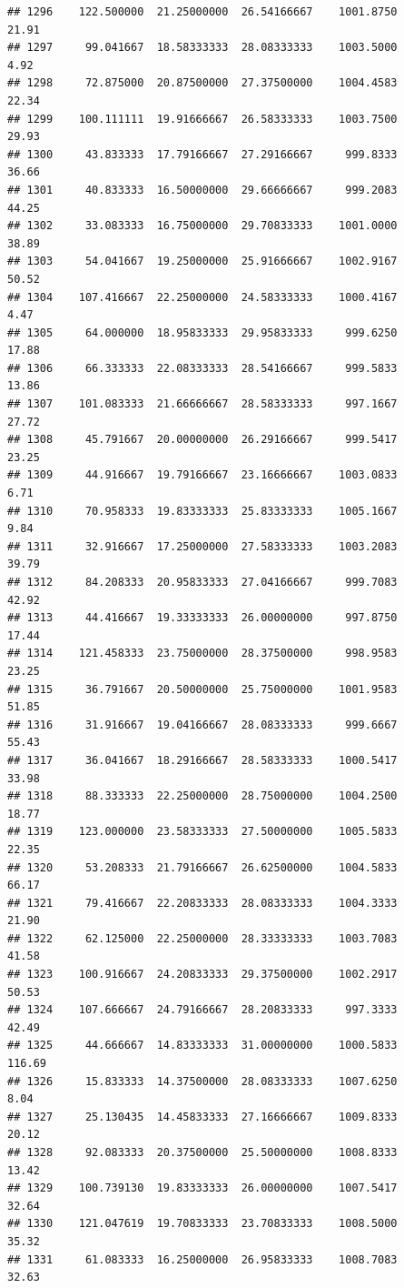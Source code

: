 \documentclass[
]{article}
\begin{document}
\begin{verbatim}
## 1296    122.500000  21.25000000  26.54166667    1001.8750       21.91
## 1297     99.041667  18.58333333  28.08333333    1003.5000        4.92
## 1298     72.875000  20.87500000  27.37500000    1004.4583       22.34
## 1299    100.111111  19.91666667  26.58333333    1003.7500       29.93
## 1300     43.833333  17.79166667  27.29166667     999.8333       36.66
## 1301     40.833333  16.50000000  29.66666667     999.2083       44.25
## 1302     33.083333  16.75000000  29.70833333    1001.0000       38.89
## 1303     54.041667  19.25000000  25.91666667    1002.9167       50.52
## 1304    107.416667  22.25000000  24.58333333    1000.4167        4.47
## 1305     64.000000  18.95833333  29.95833333     999.6250       17.88
## 1306     66.333333  22.08333333  28.54166667     999.5833       13.86
## 1307    101.083333  21.66666667  28.58333333     997.1667       27.72
## 1308     45.791667  20.00000000  26.29166667     999.5417       23.25
## 1309     44.916667  19.79166667  23.16666667    1003.0833        6.71
## 1310     70.958333  19.83333333  25.83333333    1005.1667        9.84
## 1311     32.916667  17.25000000  27.58333333    1003.2083       39.79
## 1312     84.208333  20.95833333  27.04166667     999.7083       42.92
## 1313     44.416667  19.33333333  26.00000000     997.8750       17.44
## 1314    121.458333  23.75000000  28.37500000     998.9583       23.25
## 1315     36.791667  20.50000000  25.75000000    1001.9583       51.85
## 1316     31.916667  19.04166667  28.08333333     999.6667       55.43
## 1317     36.041667  18.29166667  28.58333333    1000.5417       33.98
## 1318     88.333333  22.25000000  28.75000000    1004.2500       18.77
## 1319    123.000000  23.58333333  27.50000000    1005.5833       22.35
## 1320     53.208333  21.79166667  26.62500000    1004.5833       66.17
## 1321     79.416667  22.20833333  28.08333333    1004.3333       21.90
## 1322     62.125000  22.25000000  28.33333333    1003.7083       41.58
## 1323    100.916667  24.20833333  29.37500000    1002.2917       50.53
## 1324    107.666667  24.79166667  28.20833333     997.3333       42.49
## 1325     44.666667  14.83333333  31.00000000    1000.5833      116.69
## 1326     15.833333  14.37500000  28.08333333    1007.6250        8.04
## 1327     25.130435  14.45833333  27.16666667    1009.8333       20.12
## 1328     92.083333  20.37500000  25.50000000    1008.8333       13.42
## 1329    100.739130  19.83333333  26.00000000    1007.5417       32.64
## 1330    121.047619  19.70833333  23.70833333    1008.5000       35.32
## 1331     61.083333  16.25000000  26.95833333    1008.7083       32.63

\end{verbatim}
\end{document}
